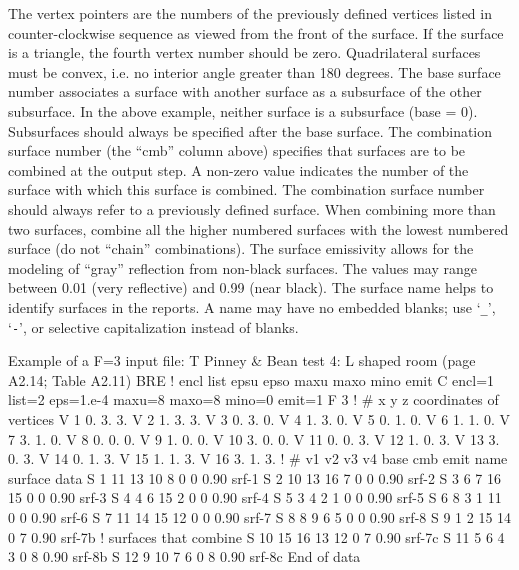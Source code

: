 \documentclass[10pt]{article}
\begin{document}
The vertex pointers are the numbers of the previously defined vertices listed 
in counter-clockwise sequence as viewed from the front of the surface. If the
surface is a triangle, the fourth vertex number should be zero. Quadrilateral
surfaces must be convex, i.e. no interior angle greater than 180 degrees.  The
base surface number associates a surface with another surface as a subsurface
of the other subsurface.  In the above example, neither surface is a subsurface
(base = 0).  Subsurfaces should always be specified after the base surface.
The combination surface number (the ``cmb'' column above) specifies that
surfaces are to be combined at the output step.  A non-zero value indicates the
number of the surface with which this surface is combined.  The combination
surface number should always refer to a previously defined surface.  When
combining more than two surfaces, combine all the higher numbered surfaces
with the lowest numbered surface (do not ``chain'' combinations).  The surface
emissivity allows for the modeling of ``gray'' reflection from non-black
surfaces. The values may range between 0.01 (very reflective) and 0.99 (near
black).  The surface name helps to identify surfaces in the reports. A name 
may have no embedded blanks; use `\verb|_|', `\verb|-|', or selective
capitalization instead of blanks.

\begin{vs3file}
Example of a F=3 input file:
T  Pinney & Bean test 4: L shaped room (page A2.14; Table A2.11) BRE
! encl list  epsu  epso  maxu maxo mino emit
C  encl=1 list=2 eps=1.e-4 maxu=8 maxo=8 mino=0 emit=1
F  3
!  #   x    y    z      coordinates of vertices
V  1   0.   3.   3.
V  2   1.   3.   3.
V  3   0.   3.   0.
V  4   1.   3.   0.
V  5   0.   1.   0.
V  6   1.   1.   0.
V  7   3.   1.   0.
V  8   0.   0.   0.
V  9   1.   0.   0.
V 10   3.   0.   0.
V 11   0.   0.   3.
V 12   1.   0.   3.
V 13   3.   0.   3.
V 14   0.   1.   3.
V 15   1.   1.   3.
V 16   3.   1.   3.
!  #   v1  v2  v3  v4 base cmb  emit  name      surface data
S  1   11  13  10   8   0   0   0.90  srf-1
S  2   10  13  16   7   0   0   0.90  srf-2
S  3    6   7  16  15   0   0   0.90  srf-3
S  4    4   6  15   2   0   0   0.90  srf-4
S  5    3   4   2   1   0   0   0.90  srf-5
S  6    8   3   1  11   0   0   0.90  srf-6
S  7   11  14  15  12   0   0   0.90  srf-7
S  8    8   9   6   5   0   0   0.90  srf-8
S  9    1   2  15  14   0   7   0.90  srf-7b    ! surfaces that combine
S 10   15  16  13  12   0   7   0.90  srf-7c
S 11    5   6   4   3   0   8   0.90  srf-8b
S 12    9  10   7   6   0   8   0.90  srf-8c
End of data
\end{vs3file}
\end{document}
